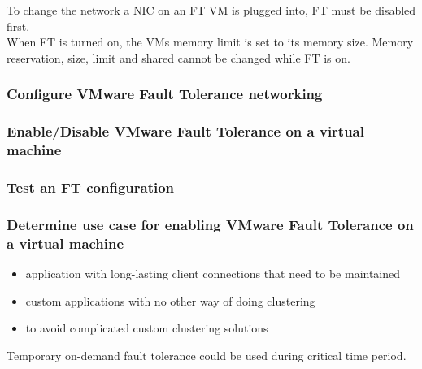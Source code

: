 To change the network a NIC on an FT VM is plugged into, FT must be disabled
first.\\

When FT is turned on, the VMs memory limit is set to its memory size.
Memory reservation, size, limit and shared cannot be changed while FT is on.

\subsubsection{Configure VMware Fault Tolerance networking}

\subsubsection{Enable/Disable VMware Fault Tolerance on a virtual machine}

\subsubsection{Test an FT configuration}

\subsubsection{Determine use case for enabling VMware Fault Tolerance on a virtual machine}

\begin{itemize}

\item application with long-lasting client connections that need to be
maintained

\item custom applications with no other way of doing clustering

\item to avoid complicated custom clustering solutions

\end{itemize}

Temporary on-demand fault tolerance could be used during critical time period.
